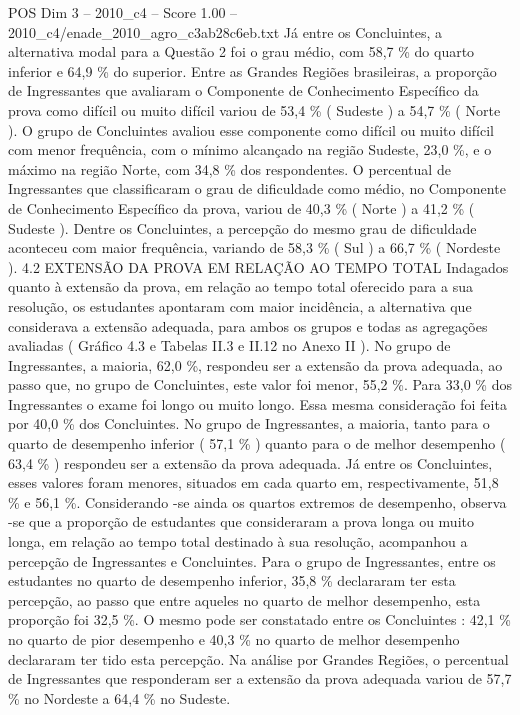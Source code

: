 \begin{textsample}{POS Dim 3 – 2010\_c4 – Score 1.00 – 2010\_c4/enade\_2010\_agro\_c3ab28c6eb.txt}
Já entre os Concluintes, a alternativa modal para a Questão 2 foi o grau médio, com 58,7 \% do quarto inferior e 64,9 \% do superior.
Entre as Grandes Regiões brasileiras, a proporção de Ingressantes que avaliaram o Componente de Conhecimento Específico da prova como difícil ou muito difícil variou de 53,4 \% ( Sudeste ) a 54,7 \% ( Norte ).
O grupo de Concluintes avaliou esse componente como difícil ou muito difícil com menor frequência, com o mínimo alcançado na região Sudeste, 23,0 \%, e o máximo na região Norte, com 34,8 \% dos respondentes.
O percentual de Ingressantes que classificaram o grau de dificuldade como médio, no Componente de Conhecimento Específico da prova, variou de 40,3 \% ( Norte ) a 41,2 \% ( Sudeste ).
Dentre os Concluintes, a percepção do mesmo grau de dificuldade aconteceu com maior frequência, variando de 58,3 \% ( Sul ) a 66,7 \% ( Nordeste ). 4.2 EXTENSÃO DA PROVA EM RELAÇÃO AO TEMPO TOTAL Indagados quanto à extensão da prova, em relação ao tempo total oferecido para a sua resolução, os estudantes apontaram com maior incidência, a alternativa que considerava a extensão adequada, para ambos os grupos e todas as agregações avaliadas ( Gráfico 4.3 e Tabelas II.3 e II.12 no Anexo II ).
No grupo de Ingressantes, a maioria, 62,0 \%, respondeu ser a extensão da prova adequada, ao passo que, no grupo de Concluintes, este valor foi menor, 55,2 \%.
Para 33,0 \% dos Ingressantes o exame foi longo ou muito longo.
Essa mesma consideração foi feita por 40,0 \% dos Concluintes.
No grupo de Ingressantes, a maioria, tanto para o quarto de desempenho inferior ( 57,1 \% ) quanto para o de melhor desempenho ( 63,4 \% ) respondeu ser a extensão da prova adequada.
Já entre os Concluintes, esses valores foram menores, situados em cada quarto em, respectivamente, 51,8 \% e 56,1 \%.
Considerando -se ainda os quartos extremos de desempenho, observa -se que a proporção de estudantes que consideraram a prova longa ou muito longa, em relação ao tempo total destinado à sua resolução, acompanhou a percepção de Ingressantes e Concluintes.
Para o grupo de Ingressantes, entre os estudantes no quarto de desempenho inferior, 35,8 \% declararam ter esta percepção, ao passo que entre aqueles no quarto de melhor desempenho, esta proporção foi 32,5 \%.
O mesmo pode ser constatado entre os Concluintes : 42,1 \% no quarto de pior desempenho e 40,3 \% no quarto de melhor desempenho declararam ter tido esta percepção.
Na análise por Grandes Regiões, o percentual de Ingressantes que responderam ser a extensão da prova adequada variou de 57,7 \% no Nordeste a 64,4 \% no Sudeste.

\end{textsample}
